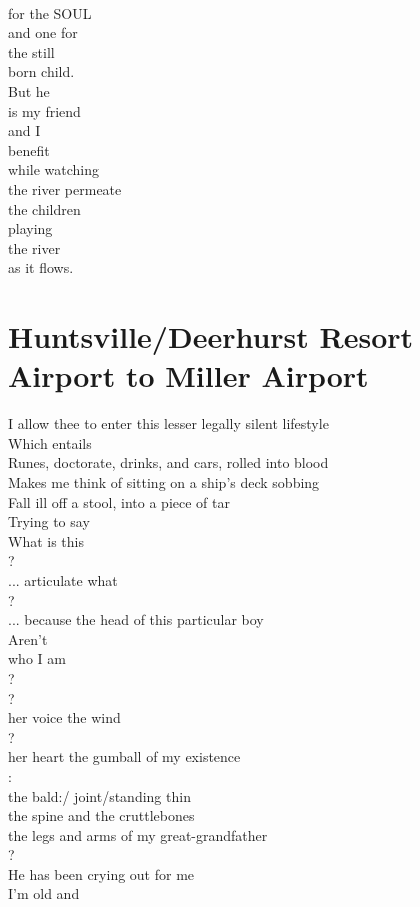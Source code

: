 \documentclass[smalldemyvopaper,11pt,twoside,onecolumn,openright,extrafontsizes]{memoir}
\begin{document}
\\for the SOUL
\\and one for
\\the still
\\born child.
\\But he
\\is my friend
\\and I
\\benefit
\\while watching
\\the river permeate
\\the children
\\playing
\\the river
\\as it flows.



\chapter{Huntsville/Deerhurst Resort Airport to Miller Airport}
I allow thee to enter this lesser legally silent lifestyle
\\Which entails
\\Runes, doctorate, drinks, and cars, rolled into blood
\\Makes me think of sitting on a ship's deck sobbing
\\Fall ill off a stool, into a piece of tar
\\Trying to say
\\What is this
\\?
\\... articulate what
\\?
\\... because the head of this particular boy
\\Aren't
\\who I am
\\?
\\?
\\her voice the wind
\\?
\\her heart the gumball of my existence
\\:
\\the bald:/ joint/standing thin
\\the spine and the cruttlebones
\\the legs and arms of my great-grandfather
\\?
\\He has been crying out for me
\\I'm old and
\end{document}
